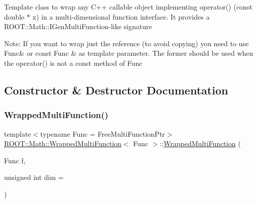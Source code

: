 Template class to wrap any C++ callable object implementing operator() (const double $\ast$ x) in a multi-\/dimensional function interface. It provides a R\+O\+O\+T\+::\+Math\+::\+I\+Gen\+Multi\+Function-\/like signature

Note\+: If you want to wrap just the reference (to avoid copying) you need to use Func\& or const Func \& as template parameter. The former should be used when the operator() is not a const method of Func 

\subsection{Constructor \& Destructor Documentation}
\mbox{\label{classROOT_1_1Math_1_1WrappedMultiFunction_a015f33dec6c241c6b5662df06ea4ddb9}} 
\subsubsection{\texorpdfstring{WrappedMultiFunction()}{WrappedMultiFunction()}\hspace{0.1cm}{\footnotesize\ttfamily [1/2]}}
{\footnotesize\ttfamily template$<$typename Func  = Free\+Multi\+Function\+Ptr$>$ \\
\mbox{\hyperlink{classROOT_1_1Math_1_1WrappedMultiFunction}{R\+O\+O\+T\+::\+Math\+::\+Wrapped\+Multi\+Function}}$<$ Func $>$\+::\mbox{\hyperlink{classROOT_1_1Math_1_1WrappedMultiFunction}{Wrapped\+Multi\+Function}} (\begin{DoxyParamCaption}\item[{Func}]{f,  }\item[{unsigned int}]{dim = {} }\end{DoxyParamCaption})\hspace{0.3cm}{\ttfamily [inline]}}

